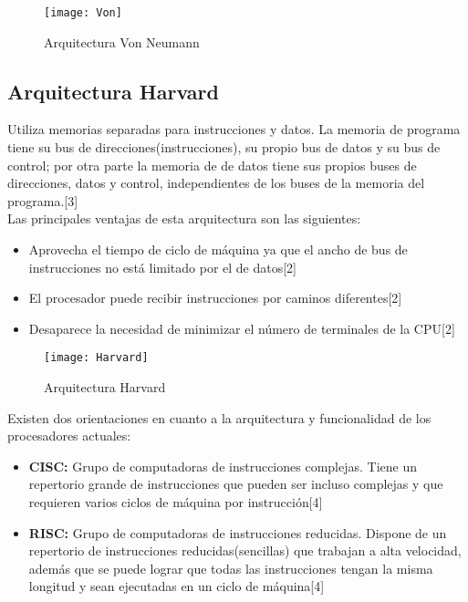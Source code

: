\begin{figure}[h]
    \centering
    \texttt{[image: Von]}
    \caption{Arquitectura Von Neumann}
    \label{fig:mesh1}
\end{figure}

\subsection{Arquitectura Harvard}
Utiliza memorias separadas para instrucciones y datos. La memoria de programa tiene su bus de direcciones(instrucciones), su propio bus de datos y su bus de control; por otra parte la memoria de de datos tiene sus propios buses de direcciones, datos y control, independientes de los buses de la memoria del programa.[3] \\

Las principales ventajas de esta arquitectura son las siguientes:
\begin{itemize}
    \item Aprovecha el tiempo de ciclo de máquina ya que el ancho de bus de instrucciones no está limitado por el de datos[2]
    \item El procesador puede recibir instrucciones por caminos diferentes[2]
    \item Desaparece la necesidad de minimizar el número de terminales de la CPU[2]
\end{itemize}


\begin{figure}[h]
    \centering
    \texttt{[image: Harvard]}
    \caption{Arquitectura Harvard}
    \label{fig:mesh1}
\end{figure}

Existen dos orientaciones en cuanto a la arquitectura y funcionalidad de los procesadores actuales:

\begin{itemize}
    \item \textbf{CISC:} Grupo de computadoras de instrucciones complejas. Tiene un repertorio grande de instrucciones que pueden ser incluso complejas y que requieren varios ciclos de máquina por instrucción[4]
    
    \item \textbf{RISC:} Grupo de computadoras de instrucciones reducidas. Dispone de un repertorio de instrucciones reducidas(sencillas) que trabajan a alta velocidad, además que se puede lograr que todas las instrucciones tengan la misma longitud y sean ejecutadas en un ciclo de máquina[4]
\end{itemize}

